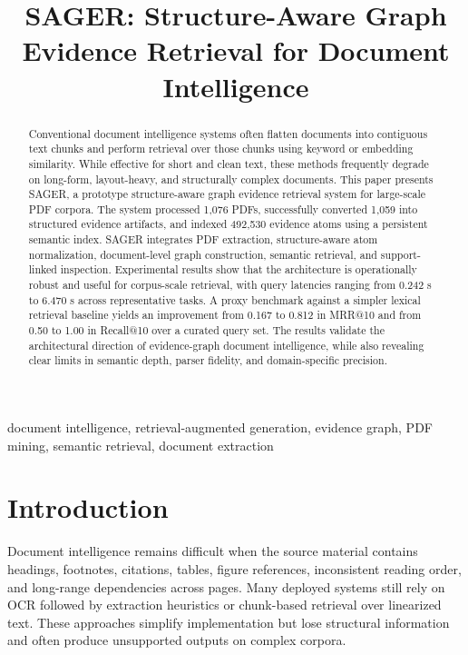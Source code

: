 \documentclass[conference]{IEEEtran}
\title{SAGER: Structure-Aware Graph Evidence Retrieval for Document Intelligence}
\author{
\IEEEauthorblockN{Meet Jethwa}
\IEEEauthorblockA{Independent Research / DocIntelligence Prototype\\
India\\
Email: add-your-email-before-submission}
}
\begin{document}
\maketitle

\begin{abstract}
Conventional document intelligence systems often flatten documents into contiguous text chunks and perform retrieval over those chunks using keyword or embedding similarity. While effective for short and clean text, these methods frequently degrade on long-form, layout-heavy, and structurally complex documents. This paper presents SAGER, a prototype structure-aware graph evidence retrieval system for large-scale PDF corpora. The system processed 1,076 PDFs, successfully converted 1,059 into structured evidence artifacts, and indexed 492,530 evidence atoms using a persistent semantic index. SAGER integrates PDF extraction, structure-aware atom normalization, document-level graph construction, semantic retrieval, and support-linked inspection. Experimental results show that the architecture is operationally robust and useful for corpus-scale retrieval, with query latencies ranging from 0.242 s to 6.470 s across representative tasks. A proxy benchmark against a simpler lexical retrieval baseline yields an improvement from 0.167 to 0.812 in MRR@10 and from 0.50 to 1.00 in Recall@10 over a curated query set. The results validate the architectural direction of evidence-graph document intelligence, while also revealing clear limits in semantic depth, parser fidelity, and domain-specific precision.
\end{abstract}

\begin{IEEEkeywords}
document intelligence, retrieval-augmented generation, evidence graph, PDF mining, semantic retrieval, document extraction
\end{IEEEkeywords}

\section{Introduction}
Document intelligence remains difficult when the source material contains headings, footnotes, citations, tables, figure references, inconsistent reading order, and long-range dependencies across pages. Many deployed systems still rely on OCR followed by extraction heuristics or chunk-based retrieval over linearized text. These approaches simplify implementation but lose structural information and often produce unsupported outputs on complex corpora.
\end{document}

